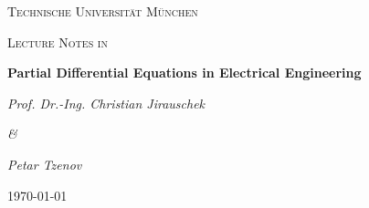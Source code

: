 \documentclass[11pt,a4paper]{report}%
\begin{document}
%
\begin{titlepage}
\centering
{\scshape\LARGE Technische Universit\"at M\"unchen\par}  \vspace{1cm}
{\scshape\Large Lecture Notes in\par}  \vspace{1.5cm}  {\huge\bfseries Partial
Differential Equations in Electrical Engineering \par}  \vspace{2cm}
{\Large\itshape Prof. Dr.-Ing. Christian Jirauschek \par}
{\Large\itshape \& \par} 
{\Large\itshape Petar Tzenov \par}  \vfill
{\large\today\par}
\end{titlepage}%

\tableofcontents





\end{document}

